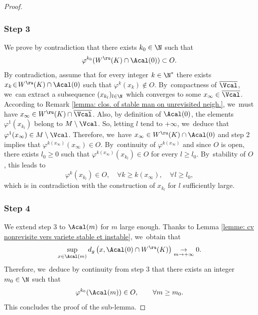 \begin{proof}
\subsubsection*{Step 3} We prove by contradiction that there exists $k_0 \in \N$ such that
\[
\varphi^{k_0} (W^\ru (K) \cap \Acal(0)) \subset O.
\]
By contradiction, assume that for every integer $k \in \N^*$ there exists $x_k\!\in\! W^\ru (K) \cap\nobreak \Acal (0)$ such that $\varphi^{k} (x_k) \notin O$. By~compactness of $\overline{\Vcal}$, we~can extract a subsequence $(x_{k_l})_{l \in \N}$ which converges to some $x_{\infty} \in \overline{\Vcal}$. According to Remark \ref{lemma: clos. of stable man on unrevisited neigh.}, we~must have $x_{\infty} \in W^\ru (K) \cap \overline{\Vcal}$. Also, by definition of $\Acal (0)$, the elements $\varphi^1 (x_{k_l})$ belong to $M \setminus \Vcal$. So, letting $l$ tend to $+\infty$, we~deduce that $\varphi^1 (x_{\infty}) \in M \setminus \Vcal $. Therefore, we~have $x_{\infty} \in W^\ru (K) \cap \Acal (0)$ and step 2 implies that $\varphi^{k (x_{\infty})} (x_{\infty}) \in O$. By~continuity of $\varphi^{k (x_{\infty})}$ and since $O$ is open, there exists $l_0 \geq 0$ such that $\varphi^{k (x_{\infty})} (x_{k_l}) \in O$ for every $l \geq l_0$. By~stability of $O$, this leads to
\[
\varphi^{k} (x_{k_l}) \in O, \quad \forall k \geq k(x_{\infty}), \quad \forall l \geq l_0,
\]
which is in contradiction with the construction of $x_{k_l}$ for $l$ sufficiently large.

\Changelback

\subsubsection*{Step 4} We extend step 3 to $\Acal (m)$ for $m$ large enough. Thanks to Lemma \ref{lemme: cv nonrevisite vers variete stable et instable}, we~obtain that
\[
\sup_{x \in \Acal (m) } d_g \left(x, \Acal (0) \cap W^\ru(K) \right) \underset{m \to +\infty}{\to} 0.
\]
Therefore, we~deduce by continuity from step 3 that there exists an integer $m_0 \in \N$ such that
\begin{equation}\label{eq: lemme filtration cv uniform R(n)}
\varphi^{ k_0} (\Acal (m)) \in O, \qquad \forall m \geq m_0.
\end{equation}
This concludes the proof of the sub-lemma.
\end{proof}

